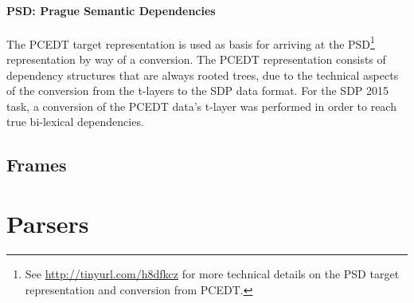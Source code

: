 \paragraph{PSD: Prague Semantic Dependencies} The PCEDT target representation is used as basis for arriving at the PSD\footnote{See \url{http://tinyurl.com/h8dfkcz} for more technical details on the PSD target representation and conversion from PCEDT.} representation by way of a conversion. The PCEDT representation consists of dependency structures that are always rooted trees, due to the technical aspects of the conversion from the t-layers to the SDP data format. For the SDP 2015 task, a conversion of the PCEDT data's t-layer was performed in order to reach true bi-lexical dependencies.\\

\subsection{Frames}
\label{sec:frames}


\section{Parsers}
\label{sec:parsers}

